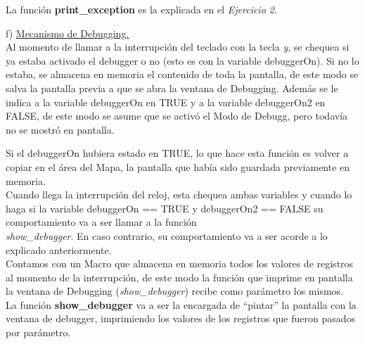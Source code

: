 \documentclass[a4paper]{article}
\begin{document}
La funci\'on \textbf{print_exception} es la explicada en el \emph{Ejercicio 2}.

\bigskip

\newpage
{\large f)} \underline{Mecanismo de Debugging.}\\

Al momento de llamar a la interrupci\'on del teclado con la tecla \emph{y}, se chequea si ya estaba activado el debugger o no (esto es con la variable debuggerOn). Si no lo estaba, se almacena en memoria el contenido de toda la pantalla, de este modo se salva la pantalla previa a que se abra la ventana de Debugging. Adem\'as se le indica a la variable debuggerOn en TRUE y a la variable debuggerOn2 en FALSE, de este modo se asume que se activ\'o el Modo de Debugg, pero todav\'ia no se mostr\'o en pantalla.

Si el debuggerOn hubiera estado en TRUE, lo que hace esta funci\'on es volver a copiar en el \'area del Mapa, la pantalla que hab\'ia sido guardada previamente en memoria.\\

Cuando llega la interrupci\'on del reloj, esta chequea ambas variables y cuando lo haga si la variable debuggerOn == TRUE y debuggerOn2 == FALSE su comportamiento va a ser llamar a la funci\'on \\ \textit{show_debugger}. En caso contrario, su comportamiento va a ser acorde a lo explicado anteriormente.\\


Contamos con un Macro que almacena en memoria todos los valores de registros al momento de la interrupci\'on, de este modo la funci\'on que imprime en pantalla la ventana de Debugging (\textit{show_debugger}) recibe como par\'ametro los mismos.\\

La funci\'on \textbf{show_debugger} va a ser la encargada de ``pintar'' la pantalla con la ventana de debugger, imprimiendo los valores de los registros que fueron pasados por par\'ametro.
\end{document}
